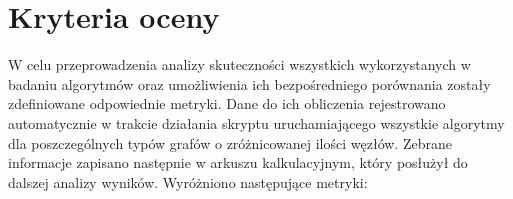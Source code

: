 
\section{Kryteria oceny}

W celu przeprowadzenia analizy skuteczności wszystkich wykorzystanych w badaniu algorytmów oraz umożliwienia ich bezpośredniego porównania zostały zdefiniowane odpowiednie metryki. Dane do ich obliczenia rejestrowano automatycznie w trakcie działania skryptu uruchamiającego wszystkie algorytmy dla poszczególnych typów grafów o zróżnicowanej ilości węzłów. Zebrane informacje zapisano następnie w arkuszu kalkulacyjnym, który posłużył do dalszej analizy wyników. Wyróżniono następujące metryki:

